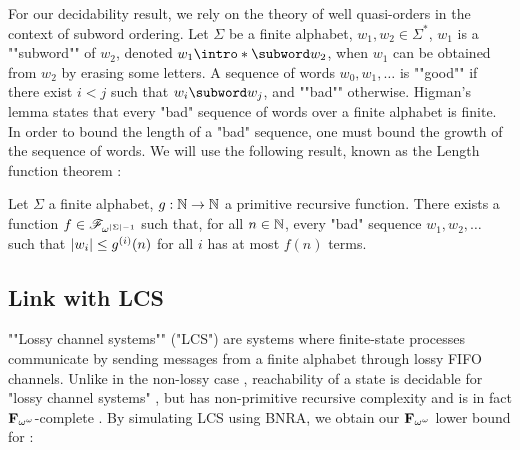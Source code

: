For our decidability result, we rely on the theory of well quasi-orders in the context of subword ordering.
Let $\Sigma$ be a finite alphabet, $w_1, w_2 \in \Sigma^*$, $w_1$ is a ""subword"" of $w_2$, denoted $w_1 \intro*\subword w_2$, when $w_1$ can be obtained from $w_2$ by erasing some letters. 
A sequence of words $w_0, w_1, \ldots$ is ""good"" if there exist $i<j$ such that $w_i \subword w_j$, and ""bad"" otherwise. Higman's lemma \cite{Higman52} states that every "bad" sequence of words over a finite alphabet is finite.
In order to bound the length of a "bad" sequence, one must bound the growth of the sequence of words. 
We will use the following result, known as the Length function theorem \cite{SchmitzS2011upperHigman}:

\begin{theorem}
	\label{thm:lengthfcttheorem}
	Let $\Sigma$ a finite alphabet, $g : \mathbb{N} \to \mathbb{N}$ a primitive recursive function.
	There exists a function $f \in \mathscr{F}_{\omega^{|\Sigma| - 1}}$ such that, for all $n \in \mathbb{N}$, every "bad" sequence $w_1, w_2, \ldots$ such that $|w_i| \leq g^{(i)}(n)$ for all $i$ has at most $f(n)$ terms. 
\end{theorem}



\subsection{Link with LCS}

""Lossy channel systems"" ("LCS") are systems where finite-state processes communicate by sending messages from a finite alphabet through lossy FIFO channels. Unlike in the non-lossy case \cite{BZ83}, reachability of a state is decidable for "lossy channel systems" \cite{AbdullaJ1996verif}, but has non-primitive recursive complexity \cite{Schnoebelen2002verifying} and is in fact $\mathbf{F}_{\omega^{\omega}}$-complete \cite{ChambartS08ordinal}. 
By simulating LCS using BNRA, we obtain our $\mathbf{F}_{\omega^{\omega}}$ lower bound for \COVER:

